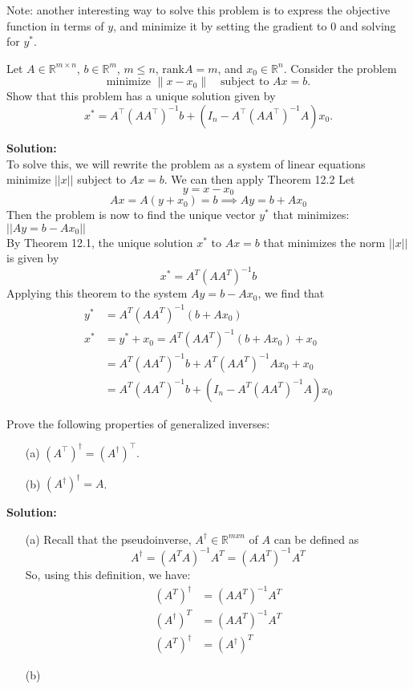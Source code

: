 \documentclass{article}
\begin{document}
\begin{enumerate}
Note: another interesting way to solve this problem is to express the objective function in terms of $y$, and minimize it by setting the gradient to $0$ and solving for $y^*$.

\bigbreak

\begin{bb}
    \item Let $A \in \mathbb{R}^{m \times n}$, $b \in \mathbb{R}^m$, $m \leq n$, $\text{rank} A = m$, and $x_0 \in \mathbb{R}^n$. Consider the problem
    \[
    \text{minimize } \|x - x_0\| \quad \text{subject to } Ax = b.
    \]
    Show that this problem has a unique solution given by
    \[
    x^* = A^\top \left( AA^\top \right)^{-1} b + \left( I_n - A^\top \left( AA^\top \right)^{-1} A \right) x_0.
    \]
\end{bb}
\textbf{Solution:}\\
To solve this, we will rewrite the problem as a system of linear equations minimize $||x||$ subject to $Ax=b$. We can then apply Theorem 12.2
Let \[ y = x-x_0 \]
\[Ax = A(y+x_0) = b \implies Ay = b + Ax_0\]
Then the problem is now to find the unique vector $y^*$ that minimizes:  $||Ay = b - Ax_0||$
\\By Theorem 12.1, the unique solution $x^*$ to $Ax = b$ that minimizes the norm $||x||$ is given by 
$$x^*=A^T(AA^T)^{-1}b$$
Applying this theorem to the system $Ay = b - Ax_0$, we find that
\begin{align*}
    y^* &= A^T(AA^T)^{-1}(b+Ax_0) \\
    x^* &= y^* + x_0 =  A^T(AA^T)^{-1}(b+Ax_0) + x_0 \\
    &= A^T(AA^T)^{-1}b + A^T(AA^T)^{-1}Ax_0 + x_0 \\
    &= A^T(AA^T)^{-1}b + (I_n - A^T(AA^T)^{-1}A)x_0
\end{align*}

\bigbreak

\begin{bb}
\item Prove the following properties of generalized inverses:
\begin{enumerate}
    \item[(a)] $(A^\top)^\dagger = (A^\dagger)^\top$.
    \item[(b)] $(A^\dagger)^\dagger = A$.
\end{enumerate}    
\end{bb}

\textbf{Solution:}\\
\begin{enumerate}
    \item[(a)] 
Recall that the pseudoinverse, $A^\dagger \in \mathbb{R}^{mxn}$ of $A$ can be defined as $$A^\dagger = (A^TA)^{-1}A^T = (AA^T)^{-1}A^T$$
So, using this definition, we have:
\begin{align*}
    (A^T)^\dagger &= (AA^T)^{-1}A^T \\
    (A^\dagger)^T &= (AA^T)^{-1}A^T \\ 
    (A^T)^\dagger &=  (A^\dagger)^T
\end{align*}    
    \item[(b)] 
\end{enumerate}

\end{enumerate}
\end{document}
